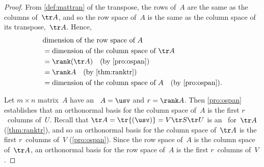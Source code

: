 \begin{proof} 
From \cref{def:mattran} of the transpose, the rows of~\(A\) are the same as the columns of~\(\tr A\), and so the row space of~\(A\) is the same as the column space of its transpose,~\(\tr A\).  
Hence,
\begin{align*}
&\text{dimension of the row space of }A
\\&=\text{dimension of the column space of }\tr A
\\&=\rank(\tr A) \quad(\text{by \cref{pro:ospan}})
\\&=\rank A \quad(\text{by \cref{thm:ranktr}})
\\&=\text{dimension of the column space of }A
\quad(\text{by \cref{pro:ospan}}).
\end{align*}

Let \(m\times n\) matrix~\(A\) have an \svd\ \(A=\usv\) and \(r=\rank A\).
Then \cref{pro:ospan} establishes that an orthonormal basis for the column space of~\(A\) is the first \(r\)~columns of~\(U\).
Recall that \(\tr A=\tr{(\usv)} =V\tr S\tr U\) is an \svd\ for~\(\tr A\) (\cref{thm:ranktr}), and so an orthonormal basis for the column space of~\(\tr A\) is the first \(r\)~columns of~\(V\) (\cref{pro:ospan}).
Since the row space of~\(A\) is the column space of~\(\tr A\), an orthonormal basis for the row space of~\(A\) is the first \(r\)~columns of~\(V\).
\end{proof}


